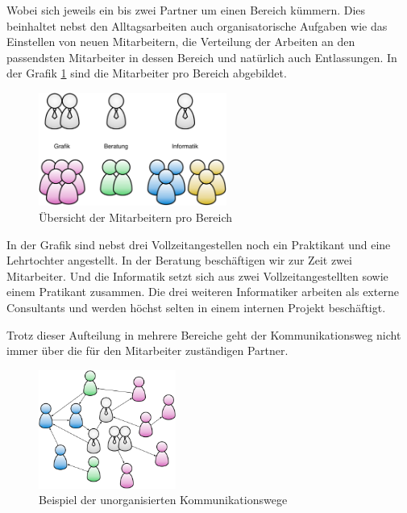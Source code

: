 Wobei sich jeweils ein bis zwei Partner um einen
Bereich kümmern. Dies beinhaltet nebst den Alltagsarbeiten auch organisatorische 
Aufgaben wie das Einstellen von neuen Mitarbeitern, die Verteilung der Arbeiten an den 
passendsten Mitarbeiter in dessen Bereich und natürlich auch Entlassungen.
In der Grafik \ref{pic:mitarbeiter_pro_bereich} sind die Mitarbeiter pro Bereich
abgebildet.

\begin{figure}[htbp]
\begin{center}
\includegraphics[width=0.55\textwidth,angle=0]{./bilder/analyse/mitarbeiter_pro_bereich.pdf}
\caption{Übersicht der Mitarbeitern pro Bereich}
\label{pic:mitarbeiter_pro_bereich}
\end{center}
\end{figure}

In der Grafik sind nebst drei Vollzeitangestellen noch ein Praktikant und eine
Lehrtochter angestellt. In der Beratung beschäftigen wir zur Zeit zwei Mitarbeiter.
Und die Informatik setzt sich aus zwei Vollzeitangestellten sowie einem Pratikant
zusammen. Die drei weiteren Informatiker arbeiten als externe Consultants und
werden höchst selten in einem internen Projekt beschäftigt.

Trotz dieser Aufteilung in mehrere Bereiche geht der Kommunikationsweg nicht
immer über die für den Mitarbeiter zuständigen Partner. 

\begin{figure}[htbp]
\begin{center}
\includegraphics[width=0.40\textwidth,angle=0]{./bilder/analyse/kommunikationswege.pdf}
\caption{Beispiel der unorganisierten Kommunikationswege}
\label{pic:kommunikationswege}
\end{center}
\end{figure}

